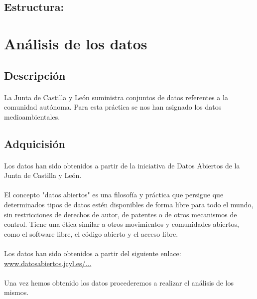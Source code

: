 \documentclass{article}
\begin{document}
		\subsection{Estructura:}

	\section{Análisis de los datos}

		\subsection{Descripción}
			\paragraph{}
			La Junta de Castilla y León suministra conjuntos de datos referentes a la comunidad autónoma. Para esta práctica se nos han asignado los datos medioambientales.

		\subsection{Adquicisión}
			\paragraph{}
			Los datos han sido obtenidos a partir de la iniciativa de Datos Abiertos de la Junta de Castilla y León.

			\paragraph{}
			El concepto "datos abiertos" es una filosofía y práctica que persigue que determinados tipos de datos estén disponibles de forma libre para todo el mundo, sin restricciones de derechos de autor, de patentes o de otros mecanismos de control. Tiene una ética similar a otros movimientos y comunidades abiertos, como el software libre, el código abierto y el acceso libre.

			\paragraph{}
			Los datos han sido obtenidos a partir del siguiente enlace: \href{http://www.datosabiertos.jcyl.es/web/jcyl/set/es/mediciones/indicadoresambientales/1284227444931}{www.datosabiertos.jcyl.es/...}

			\paragraph{}
			Una vez hemos obtenido los datos procederemos a realizar el análisis de los mismos.
\end{document}

